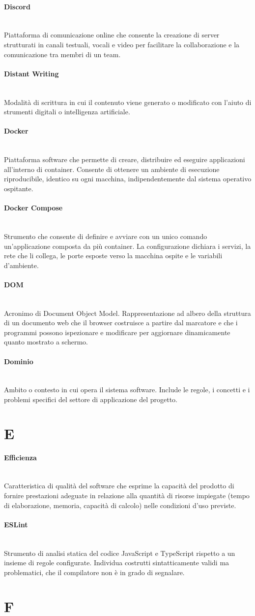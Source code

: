 \documentclass[a4paper, 10pt, colorlinks=true, linkcolor=black, urlcolor=blue, citecolor=blue, hidelinks]{article}
\newcommand{\glossaryterm}[2]{
    \paragraph{#1 \label{term:#1}} \mbox{} \\
    #2
    \vspace{0.5em}
}
\begin{document}
\glossaryterm{Discord}{Piattaforma di comunicazione online che consente la creazione di server strutturati in canali testuali, vocali e video per facilitare la collaborazione e la comunicazione tra membri di un team.}

\glossaryterm{Distant Writing}{Modalità di scrittura in cui il contenuto viene generato o modificato con l'aiuto di strumenti digitali o intelligenza artificiale.}

\glossaryterm{Docker}{Piattaforma software che permette di creare, distribuire ed eseguire applicazioni all'interno di container. Consente di ottenere un ambiente di esecuzione riproducibile, identico su ogni macchina, indipendentemente dal sistema operativo ospitante.}

\glossaryterm{Docker Compose}{Strumento che consente di definire e avviare con un unico comando un'applicazione composta da più container. La configurazione dichiara i servizi, la rete che li collega, le porte esposte verso la macchina ospite e le variabili d'ambiente.}

\glossaryterm{DOM}{Acronimo di Document Object Model. Rappresentazione ad albero della struttura di un documento web che il browser costruisce a partire dal marcatore e che i programmi possono ispezionare e modificare per aggiornare dinamicamente quanto mostrato a schermo.}

\glossaryterm{Dominio}{Ambito o contesto in cui opera il sistema software. Include le regole, i concetti e i problemi specifici del settore di applicazione del progetto.}

\newpage

\section*{E}

\glossaryterm{Efficienza}{Caratteristica di qualità del software che esprime la capacità del prodotto di fornire prestazioni adeguate in relazione alla quantità di risorse impiegate (tempo di elaborazione, memoria, capacità di calcolo) nelle condizioni d'uso previste.}

\glossaryterm{ESLint}{Strumento di analisi statica del codice JavaScript e TypeScript rispetto a un insieme di regole configurate. Individua costrutti sintatticamente validi ma problematici, che il compilatore non è in grado di segnalare.}

\newpage

\section*{F}
\end{document}
